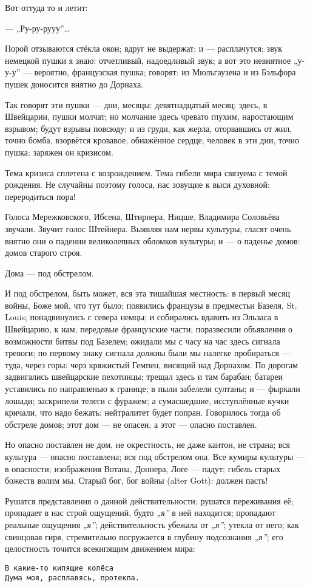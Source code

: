 \documentclass[12pt,a4paper,oneside]{book}
\begin{document}
Вот оттуда то и летит:

— „Ру-ру-рууу”…

Порой отзываются стёкла окон; вдруг не выдержат; и — расплачутся; звук немецкой пушки я знаю: отчетливый, надоедливый звук; а вот это невнятное „у-у-у” — вероятно, французская пушка; говорят: из Мюльгаузена и из Бэльфора пушек доносится внятно до Дорнаха.

Так говорят эти пушки — дни, месяцы: девятнадцатый месяц; здесь, в Швейцарии, пушки молчат; но молчание здесь чревато глухим, наростающим взрывом; будут взрывы повсюду; и из груди, как жерла, оторвавшись от жил, точно бомба, взорвётся кровавое, обнажённое сердце;  человек в эти дни, точно пушка: заряжен он кризисом.

Тема кризиса сплетена с возрождением. Тема гибели мира связуема с темой рождения. Не случайны поэтому голоса, нас зовущие к выси духовной: переродиться пора!

Голоса Мережковского, Ибсена, Штирнера, Ницше, Владимира Соловьёва звучали. Звучит голос Штейнера. Выявляя нам нервы культуры, гласят очень внятно они о падении великолепных обломков культуры; и — о паденье домов: домов старого строя.

Дома — под обстрелом.

И под обстрелом, быть может, вся эта тишайшая местность: в первый месяц войны, Боже мой, что тут было; появились французы в предместьи Базеля, St. Louis; понадвинулись с севера немцы; и собирались вдавить из Эльзаса в Швейцарию, к нам, передовые французские части; поразвесили объявления о возможности битвы под Базелем; ожидали мы с часу на час здесь сигнала тревоги; по первому знаку сигнала должны были мы налегке пробираться — туда, через горы: черз кряжистый Гемпен, висящий над Дорнахом. По дорогам задвигались швейцарские пехотинцы; трещал здесь и там барабан; батареи уставились по направленью к границе; в пыли забелели султаны; и — фыркали лошади; заскрипели телеги с фуражем; а сумасшедшие, исступлённые кучки кричали, что надо бежать: нейтралитет будет попран. Говорилось тогда об обстреле домов; этот дом — не опасен, а этот — опасно поставлен.

Но опасно поставлен не дом, не окрестность, не даже кантон, не страна; вся культура — опасно поставлена; вся под обстрелом она. Все кумиры культуры — в опасности; изображения Вотана, Доннера, Логе — падут; гибель старых божеств волим мы. Старый бог, бог войны (alter Gott): должен пасть!

Рушатся представления о данной действительности; рушатся переживания её; пропадает в нас строй ощущений, будто \emph{„я”} в ней находится; пропадают реальные ощущения \emph{„я”}; действительность убежала от \emph{„я”}; утекла от него; как свинцовая гиря, стремительно погружается в глубину подсознания \emph{„я”}; его целостность точится всекипящим движением мира:

\begin{Verbatim}
В какие-то кипящие колёса
Дума моя, расплавясь, протекла.
\end{Verbatim}
\end{document}

